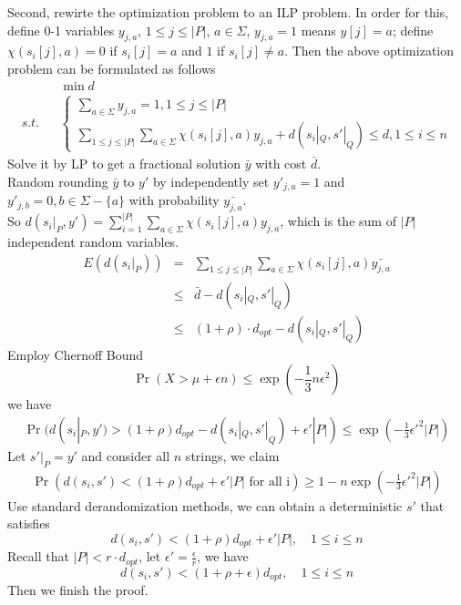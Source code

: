 \documentclass[slidestop,compress,mathserif,10pt]{beamer}
\begin{document}
{	Second, rewirte the optimization problem to an ILP problem. In order for this, 
	define 0-1 variables $y_{j,a}$, $1\le j \le |P|$, $a\in \Sigma$, $y_{j,a}=1$ means $y[j]=a$;
	define $\chi(s_i[j],a) = 0$ if $s_i[j]=a$ and $1$ if $s_i[j]\not=a$.
	Then the above optimization problem can be formulated as follows
	\begin{eqnarray*}
		&& \min d\\
		s.t. &&
		\begin{cases}
		\sum_{a\in \Sigma} y_{j,a} = 1, 1\le j \le|P|\\
		\sum_{1\le j\le |P|} \sum_{a\in \Sigma} \chi(s_i[j], a) y_{j,a} + d(s_i|_Q, s'|_Q) \le d, 1\le i\le n
		\end{cases}
	\end{eqnarray*}
	Solve it by LP to get a fractional solution $\bar{y}$ with cost $\bar{d}$.\\
	Random rounding $\bar{y}$ to $y'$ by  independently set $y'_{j,a} = 1$ and $y'_{j,b}=0, b\in \Sigma - \{a\}$ with probability $\bar{y_{j,a}}$.\\
	So $d(s_i|_P, y') = \sum_{i=1}^{|P|} \sum_{a\in\Sigma}  \chi(s_i[j], a) y_{j,a}$, which is the sum of $|P|$ independent random variables.\\
	\begin{eqnarray*}
		E(d(s_i|_P)) & = & \sum_{1\le j\le |P|} \sum_{a\in \Sigma} \chi(s_i[j], a) \bar{y_{j,a}} \\
	& \le &\bar{d} -  d(s_i|_Q, s'|_Q) \\
	& \le & (1+\rho)\cdot d_{opt} - d(s_i|_Q, s'|_Q) 
	\end{eqnarray*}
	Employ Chernoff Bound
	$$\Pr(X > \mu + \epsilon n) \le \exp(-\frac{1}{3}n\epsilon^2)$$
	we have
	\begin{eqnarray*}
		\Pr(d(s_i|_P, y') > (1+\rho)d_{opt} - d(s_i|_Q, s'|_Q) + \epsilon'|P|) \le  \exp(-\frac{1}{3}\epsilon'^2|P|)
	\end{eqnarray*}
	Let $s'|_P = y'$ and consider all $n$ strings, we claim
	\begin{eqnarray*}
		\Pr(d(s_i, s') < (1+\rho)d_{opt} + \epsilon'|P| \textrm{ for all i}) \ge  1 - n \exp(-\frac{1}{3}\epsilon'^2|P|)
	\end{eqnarray*}
	Use standard derandomization methods, we can obtain a deterministic $s'$ that satisfies
	$$d(s_i, s') < (1+\rho)d_{opt} + \epsilon'|P|, \quad 1\le i \le n$$
	Recall that $|P| < r\cdot d_{opt}$, let $\epsilon' = \frac{\epsilon}{r}$, we have
	$$d(s_i, s') < (1+\rho + \epsilon)d_{opt}, \quad 1 \le i \le n$$
	Then we finish the proof.
}
\end{document}
